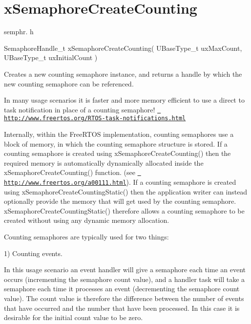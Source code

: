 \hypertarget{group__x_semaphore_create_counting}{}\section{x\+Semaphore\+Create\+Counting}
\label{group__x_semaphore_create_counting}
semphr. h 
\begin{DoxyPre}SemaphoreHandle\_t xSemaphoreCreateCounting( UBaseType\_t uxMaxCount, UBaseType\_t uxInitialCount )\end{DoxyPre}


Creates a new counting semaphore instance, and returns a handle by which the new counting semaphore can be referenced.

In many usage scenarios it is faster and more memory efficient to use a direct to task notification in place of a counting semaphore! \href{http://www.freertos.org/RTOS-task-notifications.html}{\texttt{ http\+://www.\+freertos.\+org/\+R\+T\+O\+S-\/task-\/notifications.\+html}}

Internally, within the Free\+R\+T\+OS implementation, counting semaphores use a block of memory, in which the counting semaphore structure is stored. If a counting semaphore is created using x\+Semaphore\+Create\+Counting() then the required memory is automatically dynamically allocated inside the x\+Semaphore\+Create\+Counting() function. (see \href{http://www.freertos.org/a00111.html}{\texttt{ http\+://www.\+freertos.\+org/a00111.\+html}}). If a counting semaphore is created using x\+Semaphore\+Create\+Counting\+Static() then the application writer can instead optionally provide the memory that will get used by the counting semaphore. x\+Semaphore\+Create\+Counting\+Static() therefore allows a counting semaphore to be created without using any dynamic memory allocation.

Counting semaphores are typically used for two things\+:

1) Counting events.

In this usage scenario an event handler will \textquotesingle{}give\textquotesingle{} a semaphore each time an event occurs (incrementing the semaphore count value), and a handler task will \textquotesingle{}take\textquotesingle{} a semaphore each time it processes an event (decrementing the semaphore count value). The count value is therefore the difference between the number of events that have occurred and the number that have been processed. In this case it is desirable for the initial count value to be zero.

